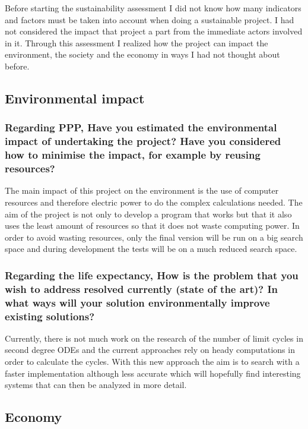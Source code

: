 Before starting the sustainability assessment I did not know how many indicators
and factors must be taken into account when doing a sustainable project. I had
not considered the impact that project a part from the immediate actors involved
in it. Through this assessment I realized how the project can impact the
environment, the society and the economy in ways I had not thought about before.

\subsection{Environmental impact}

\subsubsection*{Regarding PPP, Have you estimated the environmental impact of
undertaking the project? Have you considered how to minimise the impact, for
example by reusing resources?}

The main impact of this project on the environment is the use of computer
resources and therefore electric power to do the complex calculations needed.
The aim of the project is not only to develop a program that works but that it
also uses the least amount of resources so that it does not waste computing
power. In order to avoid wasting resources, only the final version will be run
on a big search space and during development the tests will be on a much reduced
search space.

\subsubsection*{Regarding the life expectancy, How is the problem that you wish
to address resolved currently (state of the art)? In what ways will your
solution environmentally improve existing solutions?}

Currently, there is not much work on the research of the number of limit cycles
in second degree ODEs and the current approaches rely on heady computations in
order to calculate the cycles. With this new approach the aim is to search with
a faster implementation although less accurate which will hopefully find
interesting systems that can then be analyzed in more detail.


\pagebreak
\subsection{Economy}

